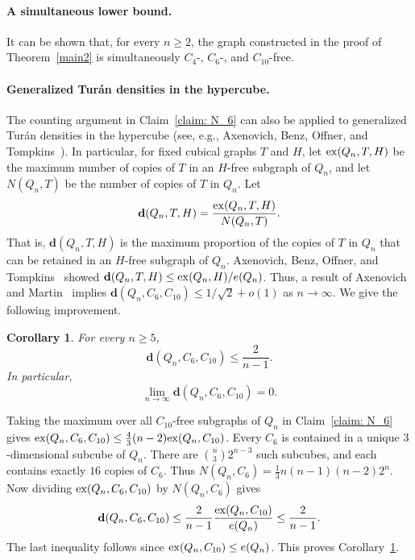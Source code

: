 \documentclass[11pt]{article}
\makeatletter
\theoremstyle{plain}
\newtheorem{corollary}[theorem]{Corollary}
\theoremstyle{definition}
\renewenvironment{proof}[1][\proofname]
{\par\pushQED{\qed}
	\normalfont\topsep6\p@\@plus6\p@\relax\trivlist
	\item[\hskip\labelsep\bfseries#1\@addpunct{.}]
	\ignorespaces}
{\popQED\endtrivlist\@endpefalse}
\newcommand{\ex}{{\rm ex}}
\makeatother
\begin{document}
\paragraph{A simultaneous lower bound.}

It can be shown that, for every $n \geq 2$, the graph constructed in the proof of Theorem~\ref{main2} is simultaneously $C_4$-, $C_6$-, and $C_{10}$-free.

\paragraph{Generalized Tur\'an densities in the hypercube.}

The counting argument in Claim~\ref{claim: N_6} can also be applied to generalized Tur\'an densities in the hypercube (see, e.g., Axenovich, Benz, Offner, and Tompkins~\cite{ABOT}). 
In particular, for fixed cubical graphs $T$ and $H$, let $\ex(Q_n,T,H)$ be the maximum number of copies of $T$ in an $H$-free subgraph of $Q_n$, and let $N(Q_n,T)$ be the number of copies of $T$ in $Q_n$. 
Let
\[
    \mathbf{d}(Q_n,T,H) = \frac{\ex(Q_n,T,H)}{N(Q_n,T)}.
\]
That is, $\mathbf{d}(Q_n,T,H)$ is the maximum proportion of the copies of $T$ in $Q_n$ that can be retained in an $H$-free subgraph of $Q_n$. 
Axenovich, Benz, Offner, and Tompkins~\cite[Lemma~3]{ABOT} showed $\mathbf{d}(Q_n,T,H) \leq \ex(Q_n,H)\allowbreak/e(Q_n)$. 
Thus, a result of Axenovich and Martin~\cite[Theorem~3.3]{AM} implies $\mathbf{d}(Q_n,C_{6},C_{10})\allowbreak\leq\allowbreak1/\sqrt{2} + o(1)$ as $n \rightarrow \infty$. 
We give the following improvement.

\begin{corollary}\label{generalized_corollary}
For every $n \geq 5$, 
\[
    \mathbf{d}(Q_n,C_6,C_{10}) %
    \leq \frac{2}{n-1}.
\]
In particular,
\[
    \lim_{n \rightarrow \infty} \mathbf{d}(Q_n,C_6,C_{10}) = 0.
\]
\end{corollary}

\begin{proof}[Proof of Corollary~\ref{generalized_corollary}]

Taking the maximum over all $C_{10}$-free subgraphs of $Q_n$ in Claim~\ref{claim: N_6} gives $\ex(Q_n,C_6,C_{10})\allowbreak\leq\allowbreak\frac{4}{3}(n-2)\ex(Q_n,C_{10})$.
Every $C_6$ is contained in a unique $3$-dimensional subcube of $Q_n$. 
There are $\binom{n}{3}2^{n-3}$ such subcubes, and each contains exactly $16$ copies of $C_6$. 
Thus $N(Q_n,C_6) = \frac{1}{3}n(n-1)(n-2)2^n$.
Now dividing $\ex(Q_n,C_6,C_{10})$ by $N(Q_n,C_6)$ gives
\[
    \mathbf{d}(Q_n,C_6,C_{10}) \leq \frac{2}{n-1} \frac{\ex(Q_n,C_{10})}{e(Q_n)} \leq \frac{2}{n-1}.
\]
The last inequality follows since $\ex(Q_n,C_{10}) \leq e(Q_n)$. 
This proves Corollary~\ref{generalized_corollary}. 

\end{proof}
\end{document}
